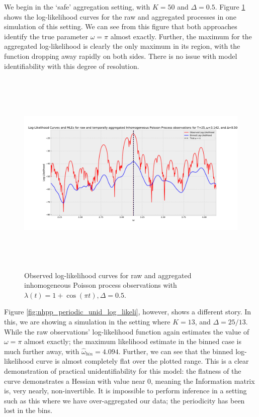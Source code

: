 \documentclass[11pt,a4,twosided,singlespacing,titlepagenumber=on,numbers=endperiod]{scrreprt}
\numberwithin{equation}{chapter} %
\theoremstyle{remark}
\begin{document}
\newpage\noindent
We begin in the `safe' aggregation setting, with $K=50$ and $\Delta=0.5$. Figure \ref{fig:nhpp_periodic_id_log_likeli} shows the log-likelihood curves for the raw and aggregated processes in one simulation of this setting. We can see from this figure that both approaches identify the true parameter $\omega = \pi$ almost exactly. Further, the maximum for the aggregated log-likelihood is clearly the only maximum in its region, with the function dropping away rapidly on both sides. There is no issue with model identifiability with this degree of resolution.
\begin{figure}[!h]
	\includegraphics[height=10cm, width=16cm]{nhpp_periodic_id_log_likeli.pdf}
	\centering
	\caption{Observed log-likelihood curves for raw and aggregated inhomogeneous Poisson process observations with $\lambda(t)= 1 + \cos(\pi t), \Delta=0.5$.}
	\label{fig:nhpp_periodic_id_log_likeli}
\end{figure}
\newpage\noindent
Figure \ref{fig:nhpp_periodic_unid_log_likeli}, however, shows a different story. In this, we are showing a simulation in the setting where $K=13$, and $\Delta=25/13$. While the raw observations' log-likelihood function again estimates the value of $\omega=\pi$ almost exactly; the maximum likelihood estimate in the binned case is much further away, with $\hat{\omega}_{bin} = 4.094$. Further, we can see that the binned log-likelihood curve is almost completely flat over the plotted range. This is a clear demonstration of practical unidentifiability for this model: the flatness of the curve demonstrates a Hessian with value near 0, meaning the Information matrix is, very nearly, non-invertible. It is impossible to perform inference in a setting such as this where we have over-aggregated our data; the periodicity has been lost in the bins.
\end{document}

